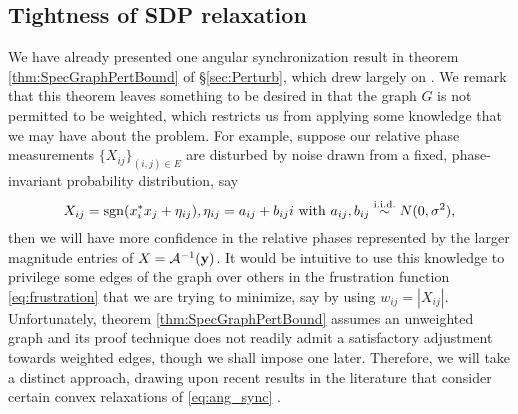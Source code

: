 \subsection{Tightness of SDP relaxation}

We have already presented one angular synchronization result in theorem \ref{thm:SpecGraphPertBound} of \S\ref{sec:Perturb}, which drew largely on \cite{alexeev2014phase}.  %
We remark that this theorem leaves something to be desired in that the graph $G$ is not permitted to be weighted, which restricts us from applying some knowledge that we may have about the problem.  For example, suppose our relative phase measurements $\{X_{ij}\}_{(i,j) \in E}$ are disturbed by noise drawn from a fixed, phase-invariant probability distribution, say \[X_{ij} = \operatorname{sgn}(x_i^*x_j + \eta_{ij}), \eta_{ij} = a_{ij} + b_{ij}i \ \text{with} \ a_{ij}, b_{ij} \overset{\text{i.i.d.}}{\sim} N(0, \sigma^2),\] then we will have more confidence in the relative phases represented by the larger magnitude entries of $X = \mathcal{A}^{-1}(\mathbf{y})$.  It would be intuitive to use this knowledge to privilege some edges of the graph over others in the frustration function \eqref{eq:frustration} that we are trying to minimize, say by using $w_{ij} = |X_{ij}|$.  Unfortunately, theorem \ref{thm:SpecGraphPertBound} assumes an unweighted graph and its proof technique does not readily admit a satisfactory adjustment towards weighted edges, though we shall impose one later.  Therefore, we will take a distinct approach, drawing upon recent results in the literature that consider certain convex relaxations of \eqref{eq:ang_sync} \cite{bandeira2016tightness, calafiore2016complex_pgo, bandeira2016se_sync}.

